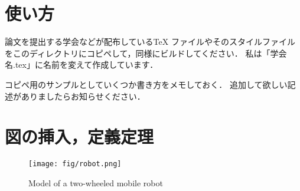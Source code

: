 \documentclass[a4j,10pt,onecolumn,oneside,titlepage,final]{jarticle}
\theoremstyle{definition}
\begin{document}


\newpage

\section{使い方}
論文を提出する学会などが配布しているTeX ファイルやそのスタイルファイルをこのディレクトリにコピペして，同様にビルドしてください．
私は「学会名.tex」に名前を変えて作成しています．

コピペ用のサンプルとしていくつか書き方をメモしておく．
追加して欲しい記述がありましたらお知らせください．



\section{図の挿入，定義定理}
\begin{figure}[tb] %
  \begin{center}
      \texttt{[image: fig/robot.png]}
  \end{center}
  \caption{Model of a two-wheeled mobile robot\label{fig:two_wheeled_mobile_robot}}
\end{figure}
\end{document}

